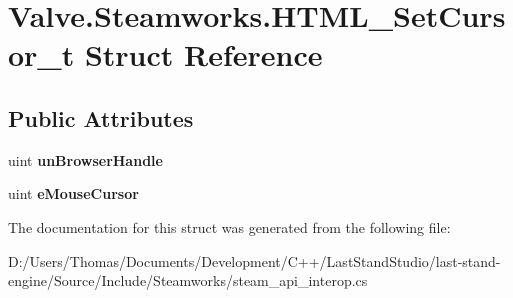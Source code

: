 \hypertarget{structValve_1_1Steamworks_1_1HTML__SetCursor__t}{}\section{Valve.\+Steamworks.\+H\+T\+M\+L\+\_\+\+Set\+Cursor\+\_\+t Struct Reference}
\label{structValve_1_1Steamworks_1_1HTML__SetCursor__t}
\subsection*{Public Attributes}
\begin{DoxyCompactItemize}
\item 
\hypertarget{structValve_1_1Steamworks_1_1HTML__SetCursor__t_ae8cb90ec5957dd352e01d82e9850a1f9}{}uint {\bfseries un\+Browser\+Handle}\label{structValve_1_1Steamworks_1_1HTML__SetCursor__t_ae8cb90ec5957dd352e01d82e9850a1f9}

\item 
\hypertarget{structValve_1_1Steamworks_1_1HTML__SetCursor__t_a462b579a933cda9ddd2b60ce2d5bc87a}{}uint {\bfseries e\+Mouse\+Cursor}\label{structValve_1_1Steamworks_1_1HTML__SetCursor__t_a462b579a933cda9ddd2b60ce2d5bc87a}

\end{DoxyCompactItemize}


The documentation for this struct was generated from the following file\+:\begin{DoxyCompactItemize}
\item 
D\+:/\+Users/\+Thomas/\+Documents/\+Development/\+C++/\+Last\+Stand\+Studio/last-\/stand-\/engine/\+Source/\+Include/\+Steamworks/steam\+\_\+api\+\_\+interop.\+cs\end{DoxyCompactItemize}
